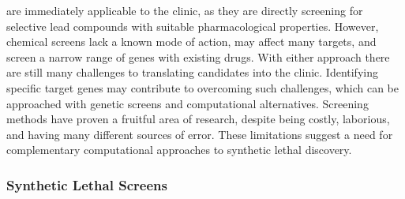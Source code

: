  are immediately applicable to the clinic, as they are directly screening for selective lead compounds with suitable pharmacological properties. However, chemical screens lack a known mode of action, may affect many targets, and screen a narrow range of genes with existing drugs. 
With either approach there are still many challenges to translating candidates into the clinic. 
Identifying specific target genes may contribute to overcoming such challenges, which can be approached with genetic screens and computational alternatives. Screening methods have proven a fruitful area of research, despite being costly, laborious, and having many different sources of error. These limitations suggest a need for complementary computational approaches to \gls{synthetic lethal} discovery.  

\subsubsection{Synthetic Lethal Screens}


